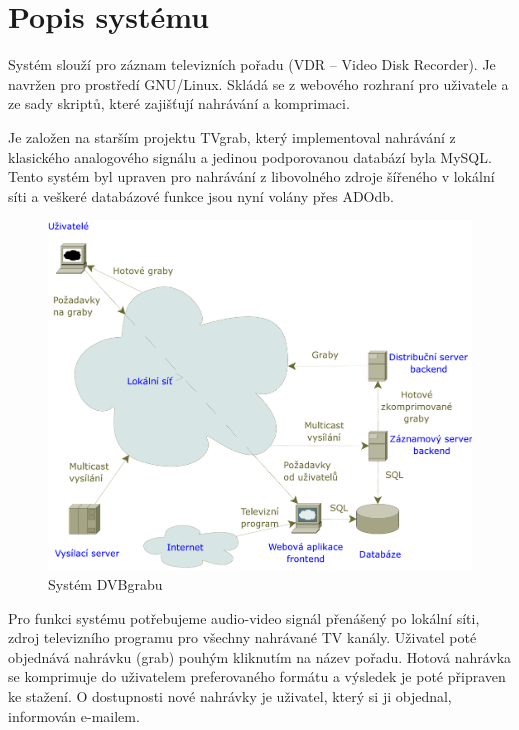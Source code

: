 \chapter{Popis systému}
Systém slouží pro záznam televizních pořadu (VDR -- Video Disk Recorder). Je navržen pro prostředí GNU/Linux. Skládá se z webového rozhraní pro uživatele a ze sady skriptů, které zajišťují nahrávání a komprimaci.

Je založen na starším projektu TVgrab, který implementoval nahrávání z klasického analogového signálu a jedinou podporovanou databází byla MySQL. Tento systém byl upraven pro nahrávání z libovolného zdroje šířeného v lokální síti a veškeré databázové funkce jsou nyní volány přes ADOdb.

\begin{figure}[ht]
\begin{center}
\includegraphics[width=15cm]{images/dvbgrab}
\caption{Systém DVBgrabu}
\label{fig:overview}
\end{center}
\end{figure}

Pro funkci systému potřebujeme audio-video signál přenášený po lokální síti, zdroj televizního programu pro všechny nahrávané TV kanály. Uživatel poté objednává nahrávku (grab) pouhým kliknutím na název pořadu. Hotová nahrávka se komprimuje do uživatelem preferovaného formátu a výsledek je poté připraven ke stažení. O dostupnosti nové nahrávky je uživatel, který si ji objednal, informován e-mailem.
\vfill
\pagebreak
